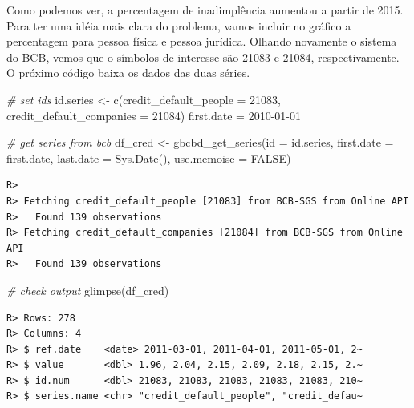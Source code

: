 \documentclass[
  11pt,
]{book}
\newenvironment{Shaded}{\begin{snugshade}}{\end{snugshade}}
\newcommand{\AttributeTok}[1]{\textcolor[rgb]{0.61,0.61,0.61}{#1}}
\newcommand{\CommentTok}[1]{\textcolor[rgb]{0.37,0.37,0.37}{\textit{#1}}}
\newcommand{\ConstantTok}[1]{\textcolor[rgb]{0,0,0}{#1}}
\newcommand{\DecValTok}[1]{\textcolor[rgb]{0.06,0.06,0.06}{#1}}
\newcommand{\FunctionTok}[1]{\textcolor[rgb]{0,0,0}{#1}}
\newcommand{\NormalTok}[1]{#1}
\newcommand{\OtherTok}[1]{\textcolor[rgb]{0.37,0.37,0.37}{#1}}
\newcommand{\StringTok}[1]{\textcolor[rgb]{0.5,0.5,0.5}{#1}}
\begin{document}
Como podemos ver, a percentagem de inadimplência aumentou a partir de 2015. Para ter uma idéia mais clara do problema, vamos incluir no gráfico a percentagem para pessoa física e pessoa jurídica. Olhando novamente o sistema do BCB, vemos que o símbolos de interesse são 21083 e 21084, respectivamente. O próximo código baixa os dados das duas séries.

\begin{Shaded}
\begin{Highlighting}[]
\CommentTok{\# set ids}
\NormalTok{id.series }\OtherTok{\textless{}{-}} \FunctionTok{c}\NormalTok{(}\AttributeTok{credit\_default\_people =} \DecValTok{21083}\NormalTok{,}
               \AttributeTok{credit\_default\_companies =} \DecValTok{21084}\NormalTok{)}
\NormalTok{first.date }\OtherTok{=} \StringTok{\textquotesingle{}2010{-}01{-}01\textquotesingle{}}

\CommentTok{\# get series from bcb}
\NormalTok{df\_cred }\OtherTok{\textless{}{-}} \FunctionTok{gbcbd\_get\_series}\NormalTok{(}\AttributeTok{id =}\NormalTok{ id.series,}
                            \AttributeTok{first.date =}\NormalTok{ first.date,}
                            \AttributeTok{last.date =} \FunctionTok{Sys.Date}\NormalTok{(), }
                            \AttributeTok{use.memoise =} \ConstantTok{FALSE}\NormalTok{)}
\end{Highlighting}
\end{Shaded}

\begin{verbatim}
R> 
R> Fetching credit_default_people [21083] from BCB-SGS from Online API 
R>   Found 139 observations
R> Fetching credit_default_companies [21084] from BCB-SGS from Online API 
R>   Found 139 observations
\end{verbatim}

\begin{Shaded}
\begin{Highlighting}[]
\CommentTok{\# check output}
\FunctionTok{glimpse}\NormalTok{(df\_cred)}
\end{Highlighting}
\end{Shaded}

\begin{verbatim}
R> Rows: 278
R> Columns: 4
R> $ ref.date    <date> 2011-03-01, 2011-04-01, 2011-05-01, 2~
R> $ value       <dbl> 1.96, 2.04, 2.15, 2.09, 2.18, 2.15, 2.~
R> $ id.num      <dbl> 21083, 21083, 21083, 21083, 21083, 210~
R> $ series.name <chr> "credit_default_people", "credit_defau~
\end{verbatim}
\end{document}
